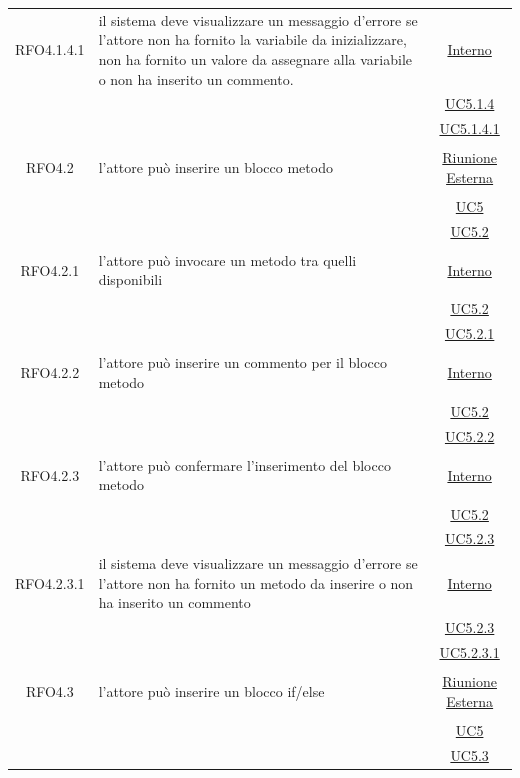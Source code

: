 \begin{longtable}{|c|>{\centering}m{7cm}|c|}
\hypertarget{RFO4.1.4.1}{RFO4.1.4.1} & il sistema deve visualizzare un messaggio d'errore se l'attore non ha fornito la variabile da inizializzare, non ha fornito un valore da assegnare alla variabile o non ha inserito un commento. & \hyperlink{Interno}{Interno}\\
& &\hyperref[UC5.1.4]{UC5.1.4}\\
& &\hyperref[UC5.1.4.1]{UC5.1.4.1}\\ \hline

\hypertarget{RFO4.2}{RFO4.2} & l'attore può inserire un blocco metodo & \hyperlink{Riunione Esterna}{Riunione Esterna}\\
& &\hyperref[UC5]{UC5}\\
& &\hyperref[UC5.2]{UC5.2}\\ \hline

\hypertarget{RFO4.2.1}{RFO4.2.1} & l'attore può invocare un metodo tra quelli disponibili & \hyperlink{Interno}{Interno}\\
& &\hyperref[UC5.2]{UC5.2}\\
& &\hyperref[UC5.2.1]{UC5.2.1}\\ \hline

\hypertarget{RFO4.2.2}{RFO4.2.2} & l'attore può inserire un commento per il blocco metodo & \hyperlink{Interno}{Interno}\\
& &\hyperref[UC5.2]{UC5.2}\\
& &\hyperref[UC5.2.2]{UC5.2.2}\\ \hline

\hypertarget{RFO4.2.3}{RFO4.2.3} & l'attore può confermare l'inserimento del blocco metodo & \hyperlink{Interno}{Interno}\\
& &\hyperref[UC5.2]{UC5.2}\\
& &\hyperref[UC5.2.3]{UC5.2.3}\\ \hline

\hypertarget{RFO4.2.3.1}{RFO4.2.3.1} & il sistema deve visualizzare un messaggio d'errore se l'attore non ha fornito un metodo da inserire o non ha inserito un commento & \hyperlink{Interno}{Interno}\\
& &\hyperref[UC5.2.3]{UC5.2.3}\\
& &\hyperref[UC5.2.3.1]{UC5.2.3.1}\\ \hline

\hypertarget{RFO4.3}{RFO4.3} & l'attore può inserire un blocco if/else & \hyperlink{Riunione Esterna}{Riunione Esterna}\\
& &\hyperref[UC5]{UC5}\\
& &\hyperref[UC5.3]{UC5.3}\\ \hline


\end{longtable}
